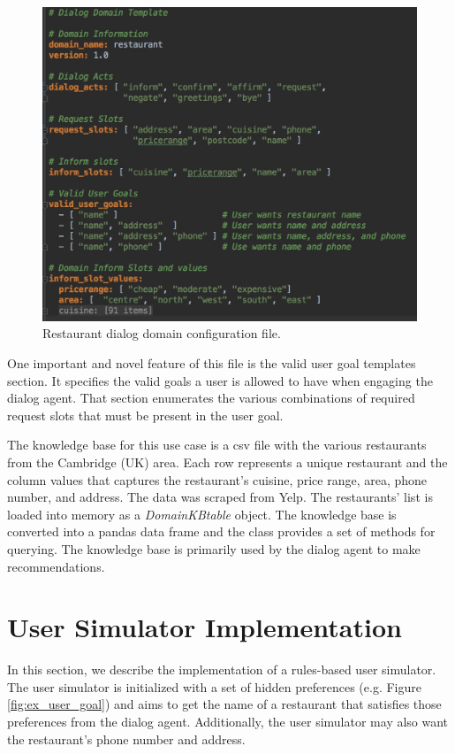 \begin{figure}[h!]
	\centering
	\includegraphics[scale=.25]{diagrams/sample_domain.jpeg}
	\caption{ Restaurant dialog domain configuration file. }
	\label{fig:restaurant_domain}
\end{figure}

One important and novel feature of this file is the valid user goal templates section. It specifies the valid goals a user is allowed to have when engaging the dialog agent. That section enumerates the various combinations of required request slots that must be present in the user goal.

The knowledge base for this use case is a csv file with the various restaurants from the Cambridge (UK) area. Each row represents a unique restaurant and the column values that captures the restaurant's cuisine, price range, area, phone number, and address. The data was scraped from Yelp. The restaurants' list is loaded into memory as a \textit{DomainKBtable} object. The knowledge base is converted into a pandas data frame and  the class provides a set of methods for querying. The knowledge base is primarily used by the dialog agent to make recommendations.

\section{User Simulator Implementation}

In this section, we describe the implementation of a rules-based user simulator. The user simulator is initialized with a set of hidden preferences (e.g. Figure \ref{fig:ex_user_goal}) and aims to get the name of a restaurant that satisfies those preferences from the dialog agent. Additionally, the user simulator may also want the restaurant's phone number and address.

